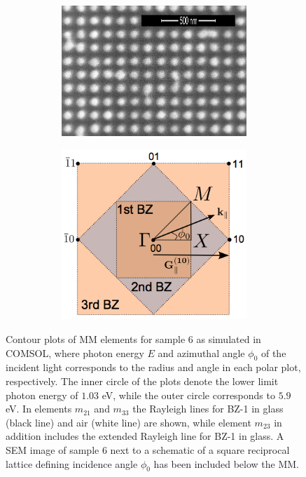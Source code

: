 \begin{figure}[h]
\begin{subfigure}{\textwidth}
\begin{subfigure}{0.5\textwidth}
        \flushright
        \includegraphics[width=0.5\linewidth]{figures/Ch3/S6_SEM(1).png} %
    \end{subfigure}
    \begin{subfigure}{0.5\textwidth}
        \flushleft
        \includegraphics[width=0.4\linewidth]{figures/Ch2/ReciprocalLattice.png}    %
    \end{subfigure}
    \label{fig:S6_reciprocallattice_schematic}
\end{subfigure}
    \caption{Contour plots of MM elements for sample 6 as simulated in COMSOL, where photon energy $E$ and azimuthal angle $\phi_0$ of the incident light corresponds to the radius and angle in each polar plot, respectively. The inner circle of the plots denote the lower limit photon energy of $1.03$ eV, while the outer circle corresponds to $5.9$ eV. In elements $m_{21}$ and $m_{33}$ the Rayleigh lines for BZ-1 in glass (black line) and air (white line) are shown, while element $m_{23}$ in addition includes the extended Rayleigh line for BZ-1 in glass. A SEM image of sample 6 next to a schematic of a square reciprocal lattice defining incidence angle $\phi_0$ has been included below the MM.}
    \label{fig:S6_contour_MM} 
\end{figure}
\begin{figure}[h]
    
\end{figure}
